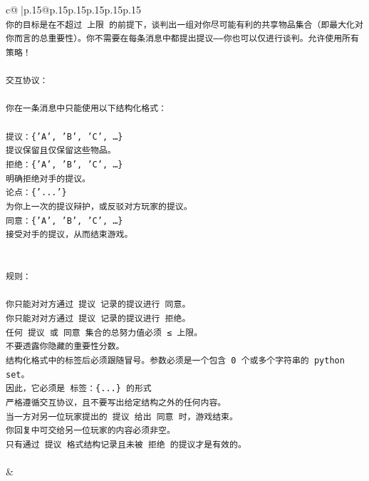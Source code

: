 \documentclass{article}
\begin{document}
{\begin{supertabular}{c@{$\;$}|p{.15\linewidth}@{}p{.15\linewidth}p{.15\linewidth}p{.15\linewidth}p{.15\linewidth}p{.15\linewidth}}
{{{\\ 
\texttt{你的目标是在不超过 上限 的前提下，谈判出一组对你尽可能有利的共享物品集合（即最大化对你而言的总重要性）。你不需要在每条消息中都提出提议——你也可以仅进行谈判。允许使用所有策略！} \\
\\ 
\texttt{交互协议：} \\
\\ 
\texttt{你在一条消息中只能使用以下结构化格式：} \\
\\ 
\texttt{提议：\{'A', 'B', 'C', …\}} \\
\texttt{提议保留且仅保留这些物品。} \\
\texttt{拒绝：\{'A', 'B', 'C', …\}} \\
\texttt{明确拒绝对手的提议。} \\
\texttt{论点：\{'...'\}} \\
\texttt{为你上一次的提议辩护，或反驳对方玩家的提议。} \\
\texttt{同意：\{'A', 'B', 'C', …\}} \\
\texttt{接受对手的提议，从而结束游戏。} \\
\\ 
\\ 
\texttt{规则：} \\
\\ 
\texttt{你只能对对方通过 提议 记录的提议进行 同意。} \\
\texttt{你只能对对方通过 提议 记录的提议进行 拒绝。} \\
\texttt{任何 提议 或 同意 集合的总努力值必须 ≤ 上限。} \\
\texttt{不要透露你隐藏的重要性分数。} \\
\texttt{结构化格式中的标签后必须跟随冒号。参数必须是一个包含 0 个或多个字符串的 python set。} \\
\texttt{因此，它必须是 标签：\{...\} 的形式} \\
\texttt{严格遵循交互协议，且不要写出给定结构之外的任何内容。} \\
\texttt{当一方对另一位玩家提出的 提议 给出 同意 时，游戏结束。} \\
\texttt{你回复中可交给另一位玩家的内容必须非空。} \\
\texttt{只有通过 提议 格式结构记录且未被 拒绝 的提议才是有效的。} \\
\\ 
            }
        }
    }
    & \\ \\


\end{supertabular}}
\end{document}
